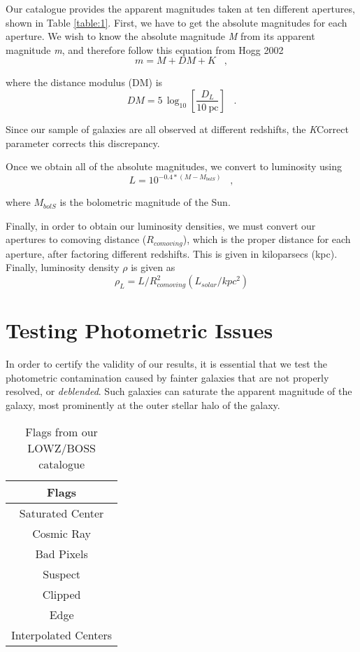 \documentclass{article}
\begin{document}
Our catalogue provides the apparent magnitudes taken at ten different apertures, shown in Table \ref{table:1}. First, we have to get the absolute magnitudes for each aperture. We wish to know the absolute magnitude \textit{M} from its apparent magnitude \textit{m}, and therefore follow this equation from Hogg 2002
\begin{equation}
m=M + DM + K \;\;\;,
\end{equation}

where the distance modulus (DM) is 
\begin{equation}
DM = 5\,\log_{10}\left[\frac{D_L}{10~\mathrm{pc}}\right] \;\;\;.
\end{equation}

Since our sample of galaxies are all observed at different redshifts, the \textit{K}Correct parameter corrects this discrepancy. 

Once we obtain all of the absolute magnitudes, we convert to luminosity using
\begin{equation}
L=10^{-0.4*(\textit{M}-\textit{M}_{bolS})} \;\;\;,
\end{equation}

where $\textit{M}_{bolS}$ is the bolometric magnitude of the Sun. 

Finally, in order to obtain our luminosity densities, we must convert our apertures to comoving distance ($R_{comoving}$), which is the proper distance for each aperture, after factoring different redshifts. This is given in kiloparsecs (kpc). Finally, luminosity density $\rho$ is given as
\begin{equation}
\rho_L=L/R_{comoving}^2 ( L_{solar}/kpc^2)
\end{equation}

\section{Testing Photometric Issues}
In order to certify the validity of our results, it is essential that we test the photometric contamination caused by fainter galaxies that are not properly resolved, or \textit{deblended}. Such galaxies can saturate the apparent magnitude of the galaxy, most prominently at the outer stellar halo of the galaxy.

\begin{table}[!htb]
\centering
\begin{tabular}{c} \toprule
\textbf{Flags} \\ \midrule
Saturated Center\\
Cosmic Ray \\
Bad Pixels \\
Suspect \\
Clipped\\
Edge\\
Interpolated Centers \\ \bottomrule
\end{tabular}
\caption{Flags from our LOWZ/BOSS catalogue}
\label{table:2}
\hfill
\end{table}
\end{document}
